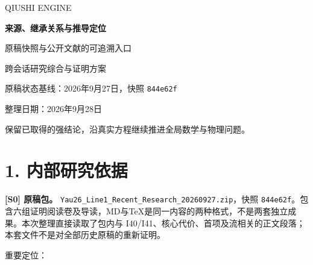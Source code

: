 \documentclass[UTF8,a4paper,11pt,fontset=fandol]{ctexart}
\begin{document}
\begin{titlepage}
\thispagestyle{empty}
\vspace*{2cm}
{\large\sffamily QIUSHI ENGINE\par}
\vspace{1.3cm}
{\Huge\bfseries 来源、继承关系与推导定位\par}
\vspace{0.8cm}
{\Large 原稿快照与公开文献的可追溯入口\par}
\vspace{1.2cm}
{\large 跨会话研究综合与证明方案\par}
\vfill
{\normalsize 原稿状态基线：2026年9月27日，快照 \texttt{844e62f}\par}
\vspace{0.35cm}
{\normalsize 整理日期：2026年9月28日\par}
\vspace{1cm}
{\small 保留已取得的强结论，沿真实方程继续推进全局数学与物理问题。\par}
\end{titlepage}
\tableofcontents
\clearpage
\section{1. 内部研究依据}\label{ux5185ux90e8ux7814ux7a76ux4f9dux636e}

\textbf{{[}S0{]} 原稿包。}
\texttt{Yau26\_Line1\_Recent\_Research\_20260927.zip}，快照
\texttt{844e62f}。包含六组证明阅读卷及导读，MD与TeX是同一内容的两种格式，不是两套独立成果。本次整理直接读取了包内与
I40/I41、核心代价、首项及流相关的正文段落；本套文件不是对全部历史原稿的重新证明。

重要定位：
\end{document}
